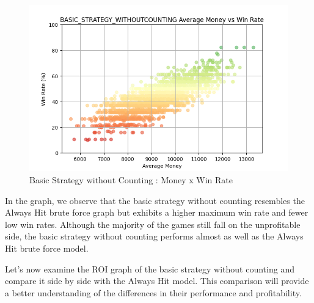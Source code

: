 \documentclass[a4paper,12pt]{report}
\begin{document}
\begin{figure}[h]
\begin{center}
\includegraphics[scale=0.6]{figures/graphs/bswc_wr.png}
\end{center}
\caption{Basic Strategy without Counting : Money x Win Rate}
\label{fig:bswc_wr}
\end{figure}

In the graph, we observe that the basic strategy without counting resembles the Always Hit brute force graph but exhibits a higher maximum win rate and fewer low win rates. Although the majority of the games still fall on the unprofitable side, the basic strategy without counting performs almost as well as the Always Hit brute force model.

Let's now examine the ROI graph of the basic strategy without counting and compare it side by side with the Always Hit model. This comparison will provide a better understanding of the differences in their performance and profitability.
\end{document}
